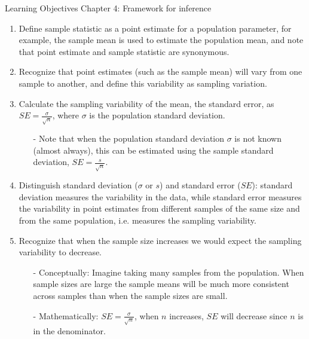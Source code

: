 \documentclass[11pt]{article}
\begin{document}
{\LARGE \textcolor{oiB}{Learning Objectives \hfill Chapter 4: Framework for inference}} \\

%

\begin{enumerate}
\renewcommand\labelenumi{\textcolor{light}{\textbf{LO \theenumi.}}}

\item Define sample statistic as a point estimate for a population parameter, for example, the sample mean is used to estimate the population mean, and note that point estimate and sample statistic are synonymous.

\item Recognize that point estimates (such as the sample mean) will vary from one sample to another, and define this variability as sampling variation.

\item Calculate the sampling variability of the mean, the standard error, as $SE = \frac{\sigma}{\sqrt{n}}$, where $\sigma$ is the population standard deviation.
\begin{itemize}
\item[-] Note that when the population standard deviation $\sigma$ is not known (almost always), this can be estimated using the sample standard deviation, $SE = \frac{s}{\sqrt{n}}$.
\end{itemize}

\item Distinguish standard deviation ($\sigma$ or $s$) and standard error ($SE$): standard deviation measures the variability in the data, while standard error measures the variability in point estimates from different samples of the same size and from the same population, i.e. measures the sampling variability.

\item Recognize that when the sample size increases we would expect the sampling variability to decrease.
\begin{itemize}
\item[-] Conceptually: Imagine taking many samples from the population. When sample sizes are large the sample means will be much more consistent across samples than when the sample sizes are small.
\item[-] Mathematically: $SE = \frac{\sigma}{\sqrt{n}}$, when $n$ increases, $SE$ will decrease since $n$ is in the denominator.
\end{itemize}

\end{enumerate}
\end{document}
